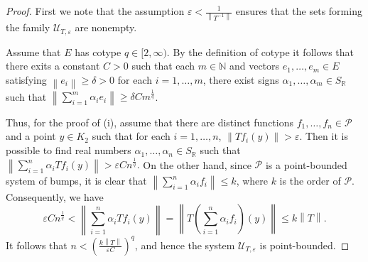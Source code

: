 \documentclass{amsart}
\numberwithin{equation}{section}
\theoremstyle{definition}
\def\ep{\varepsilon}
\def\en{\mathbb N}
\def\er{\mathbb R}
\newcommand{\norm}[1]{\left\|#1\right\|}
\begin{document}
\begin{proof}
First we note that the assumption $\ep<\frac{1}{\norm{T^{-1}}}$ ensures that the sets forming the family $\mathcal{U}_{T, \ep}$ are nonempty.

Assume that $E$ has cotype $q \in [2, \infty)$. By the definition of cotype it follows that there exits a constant $C>0$ such that each $m \in \en$ and vectors $e_1, \ldots, e_m \in E$ satisfying $\norm{e_i} \geq \delta>0$ for each $i=1, \ldots, m$, there exist signs $\alpha_1, \ldots, \alpha_m \in S_{\er}$ such that $\norm{\sum_{i=1}^m \alpha_i e_i} \geq \delta C m^{\frac{1}{q}}$.

Thus, for the proof of (i), assume that there are distinct functions $f_1, \ldots, f_n \in \mathcal{P}$ and a point $y \in K_2$ such that for each $i=1, \ldots, n$, $\norm{Tf_i(y)} > \ep$. Then it is possible to find real numbers $\alpha_1, \ldots, \alpha_n \in S_{\er}$ such that $\norm{\sum_{i=1}^n \alpha_i Tf_i(y)} >\ep C n^{\frac{1}{q}}.$ On the other hand, since $\mathcal{P}$ is a point-bounded system of bumps, it is clear that $\norm{\sum_{i=1}^n \alpha_i f_i} \leq k$, where $k$ is the order of $\mathcal{P}$. Consequently, we have
\[\ep C n^{\frac{1}{q}} < \norm{\sum_{i=1}^n \alpha_i Tf_i(y)} = \norm{T(\sum_{i=1}^n \alpha_i f_i)(y)} \leq k\norm{T}.\]
It follows that $n < (\frac{k\norm{T}}{\ep C})^{q}$, and hence the system $\mathcal{U}_{T, \ep}$ is point-bounded.


\end{proof}
\end{document}
